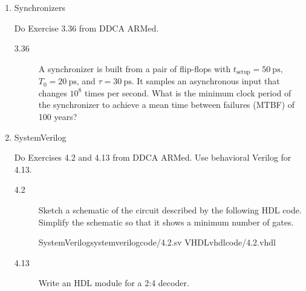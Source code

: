 \documentclass{ps}
\begin{document}
\begin{enumerate}
\begin{center}
  \end{center}
  \begin{solution}
  \end{solution}

\item Synchronizers

  Do Exercise 3.36 from DDCA ARMed.
  \begin{description}
  \item[3.36] A synchronizer is built from a pair of flip-flops with
    \(t_\text{setup} = \SI{50}{\ps}\), \(T_0 = \SI{20}{\ps}\), and
    \(\tau = \SI{30}{\ps}\).  It samples an asynchronous input that
    changes \(10^8\) times per second.  What is the minimum clock
    period of the synchronizer to achieve a mean time between failures
    (MTBF) of 100 years?
  \end{description}
  \begin{solution}
  \end{solution}

\item SystemVerilog

  Do Exercises 4.2 and 4.13 from DDCA ARMed.  Use behavioral Verilog
  for 4.13.
  \begin{description}
  \item[4.2] Sketch a schematic of the circuit described by the
    following HDL code.  Simplify the schematic so that it shows a
    minimum number of gates.
    \begin{center}
      \twocolumnlisting
      {SystemVerilog}{systemverilog}{code/4.2.sv}
      {VHDL}{vhdl}{code/4.2.vhdl}
    \end{center}
    \begin{solution}
    \end{solution}
  \item[4.13] Write an HDL module for a 2:4 decoder.
    \begin{solution}
    \end{solution}
  \end{description}


\end{enumerate}
\end{document}

